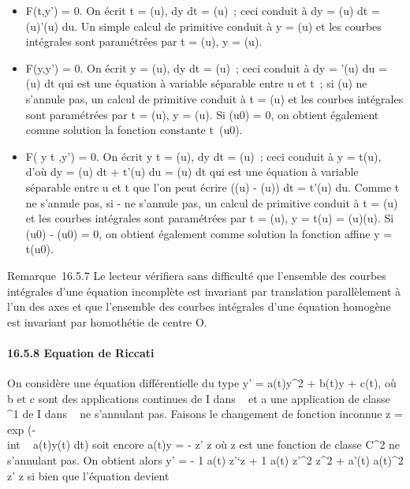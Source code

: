 \begin{itemize}
\itemsep1pt\parskip0pt
\item
  F(t,y') = 0. On écrit t = \phi(u),  dy \over dt =
  \psi(u)~; ceci conduit à dy = \psi(u) dt = \psi(u)\phi'(u) du. Un simple calcul de
  primitive conduit à y = \Psi(u) et les courbes intégrales sont
  paramétrées par t = \phi(u), y = \Psi(u).
\item
  F(y,y') = 0. On écrit y = \phi(u),  dy \over dt =
  \psi(u)~; ceci conduit à dy = \phi'(u) du = \psi(u) dt qui est une équation à
  variable séparable entre u et t~; si \psi(u) ne s'annule pas, un calcul
  de primitive conduit à t = \Phi(u) et les courbes intégrales sont
  paramétrées par t = \Phi(u), y = \psi(u). Si \phi(u0) = 0, on obtient
  également comme solution la fonction constante
  t\mapsto~\phi(u0).
\item
  F( y \over t ,y') = 0. On écrit  y
  \over t = \phi(u),  dy \over dt =
  \psi(u)~; ceci conduit à y = t\phi(u), d'où dy = \phi(u) dt + t\phi'(u) du = \psi(u)
  dt qui est une équation à variable séparable entre u et t que l'on
  peut écrire (\psi(u) - \phi(u)) dt = t\phi'(u) du. Comme t ne s'annule pas, si
  \psi - \phi ne s'annule pas, un calcul de primitive conduit à t = \Phi(u) et
  les courbes intégrales sont paramétrées par t = \Phi(u), y = t\psi(u) =
  \Phi(u)\psi(u). Si \psi(u0) - \phi(u0) = 0, on obtient
  également comme solution la fonction affine y = t\phi(u0).
\end{itemize}

Remarque~16.5.7 Le lecteur vérifiera sans difficulté que l'ensemble des
courbes intégrales d'une équation incomplète est invariant par
translation parallèlement à l'un des axes et que l'ensemble des courbes
intégrales d'une équation homogène est invariant par homothétie de
centre O.

\paragraph{16.5.8 Equation de Riccati}

On considère une équation différentielle du type y' = a(t)y^2
+ b(t)y + c(t), où b et c sont des applications continues de I dans ~ et
a une application de classe ^1 de I dans ~ ne s'annulant
pas. Faisons le changement de fonction inconnue z
= exp (-\\int ~ a(t)y(t)
dt) soit encore a(t)y = - z' \over z où z est une
fonction de classe C^2 ne s'annulant pas. On obtient alors y'
= - 1 \over a(t)  z'`\over z + 1
\over a(t)  z'^2 \over
z^2 + a'(t) \over a(t)^2 
z' \over z si bien que l'équation devient

